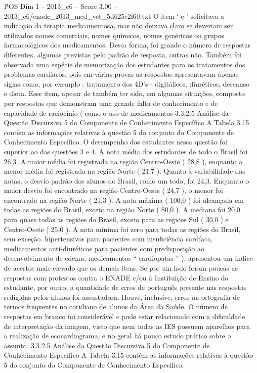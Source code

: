 \begin{textsample}{POS Dim 1 – 2013\_c6 – Score 3.00 – 2013\_c6/enade\_2013\_med\_vet\_5d625e2f60.txt}
O item ‘ c ’ solicitava a indicação da terapia medicamentosa, mas não deixava claro se deveriam ser utilizados nomes comerciais, nomes químicos, nomes genéricos ou grupos farmacológicos dos medicamentos.
Dessa forma, foi grande o número de respostas diferentes, algumas previstas pelo padrão de resposta, outras não.
Também foi observada uma espécie de memorização dos estudantes para os tratamentos dos problemas cardíacos, pois em várias provas as respostas apresentavam apenas siglas como, por exemplo : tratamento dos 4D’s - digitálicos, diuréticos, descanso e dieta.
Esse item, apesar de também ter sido, em algumas situações, composto por respostas que demonstram uma grande falta de conhecimento e de capacidade de raciocínio ( como o uso de medicamentos 3.3.2.5 Análise da Questão Discursiva 5 do Componente de Conhecimento Específico A Tabela 3.15 contém as informações relativas à questão 5 do conjunto do Componente de Conhecimento Específico.
O desempenho dos estudantes nessa questão foi superior ao das questões 3 e 4.
A nota média dos estudantes de todo o Brasil foi 26,3.
A maior média foi registrada na região Centro-Oeste ( 28,8 ), enquanto a menor média foi registrada na região Norte ( 21,7 ).
Quanto à variabilidade das notas, o desvio padrão dos alunos do Brasil, como um todo, foi 24,3.
Enquanto o maior desvio foi encontrado na região Centro-Oeste ( 24,7 ), o menor foi encontrado na região Norte ( 21,3 ).
A nota máxima ( 100,0 ) foi alcançada em todas as regiões do Brasil, exceto na região Norte ( 80,0 ).
A mediana foi 20,0 para quase todas as regiões do Brasil, exceto para as regiões Sul ( 30,0 ) e Centro-Oeste ( 25,0 ).
A nota mínima foi zero para todas as regiões do Brasil, sem exceção. hipertensivos para pacientes com insuficiência cardíaca, medicamentos anti-diuréticos para pacientes com predisposição ao desenvolvimento de edema, medicamentos “ cardiopatas ” ), apresentou um índice de acertos mais elevado que os demais itens.
Se por um lado foram poucas as respostas com protestos contra o ENADE e/ou à Instituição de Ensino do estudante, por outro, a quantidade de erros de português presente nas respostas redigidas pelos alunos foi assustadora.
Houve, inclusive, erros na ortografia de termos frequentes no cotidiano de alunos da Área da Saúde.
O número de respostas em branco foi considerável e pode estar relacionado com a dificuldade de interpretação da imagem, visto que nem todas as IES possuem aparelhos para a realização de ecocardiograma, e no geral há pouco estudo prático sobre o assunto. 3.3.2.5 Análise da Questão Discursiva 5 do Componente de Conhecimento Específico A Tabela 3.15 contém as informações relativas à questão 5 do conjunto do Componente de Conhecimento Específico.

\end{textsample}
